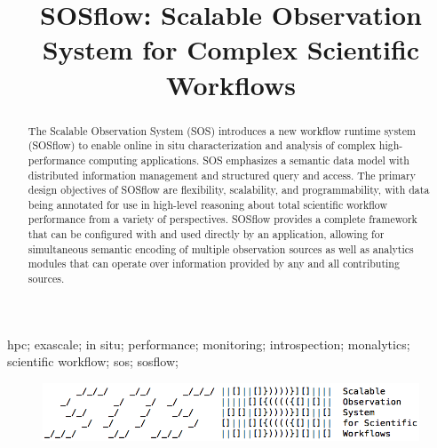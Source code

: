 
\title{SOSflow: Scalable Observation System for Complex Scientific Workflows}

\author{
         
	 
 }

\maketitle


\begin{abstract}
The Scalable Observation System (SOS) introduces a new workflow
runtime system (SOSflow) to enable online in situ characterization and
analysis of complex high-performance computing applications.
%
SOS emphasizes a semantic data model with distributed information
management and structured query and access.
%
The primary design objectives of SOSflow are flexibility, scalability,
and programmability, with data being annotated for use in high-level
reasoning about total scientific workflow performance from a variety
of perspectives.
%
SOSflow provides a complete framework that can be configured with and
used directly by an application, allowing for simultaneous semantic
encoding of multiple observation sources as well as analytics modules
that can operate over information provided by any and all contributing
sources.
\end{abstract}


\begin{IEEEkeywords}
hpc; exascale; in situ; performance; monitoring; introspection;
monalytics; scientific workflow; sos; sosflow;
\end{IEEEkeywords}


\IEEEpeerreviewmaketitle


\begin{figure}[!t]
\centering
\includegraphics[width=5in]{images/sosflow_masthead.png}
\label{fig_sim}
\end{figure}




